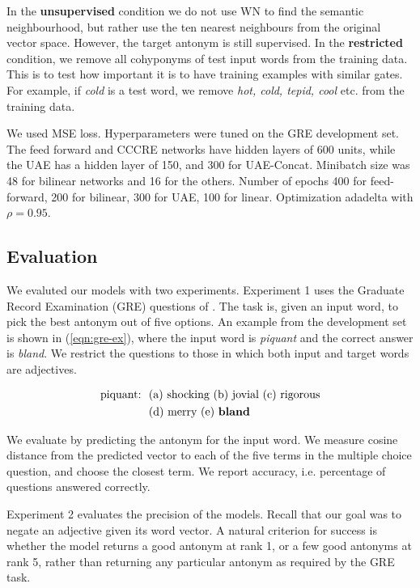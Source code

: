 \documentclass[11pt]{article}
\begin{document}
In the {\bf unsupervised} condition we do not use WN to find the semantic neighbourhood, but rather use the ten nearest neighbours from the original vector space. However, the target antonym is still supervised. In the {\bf restricted} condition, we remove all cohyponyms of test input words from the training data. This is to test how important it is to have training examples with similar gates. For example, if {\it cold} is a test word, we remove {\it hot, cold, tepid, cool} etc. from the training data.

We used MSE loss. Hyperparameters were tuned on the GRE development set. The feed forward and CCCRE networks have hidden layers of 600 units, while the UAE has a hidden layer of 150, and 300 for UAE-Concat. Minibatch size was 48 for bilinear networks and 16 for the others. Number of epochs 400 for feed-forward, 200 for bilinear, 300 for UAE, 100 for linear. Optimization adadelta with $\rho = 0.95$.


\subsection{Evaluation}

We evaluted our models with two experiments. Experiment 1 uses the Graduate Record Examination (GRE) questions of \citet{mohammad:13}. The task is, given an input word, to pick the best antonym out of five options. An example from the development set is shown in (\ref{eqn:gre-ex}), where the input word is {\it piquant} and the correct answer is {\it bland}. We restrict the questions to those in which both input and target words are adjectives.

\vspace{-6mm}
\begin{equation}
\begin{split}
\textrm{piquant:\ \ } & \textrm{(a) shocking (b) jovial (c) rigorous} \\
& \textrm{(d) merry (e) {\bf bland}}
\label{eqn:gre-ex}
\end{split}
\end{equation}
\vspace{-4mm}

We evaluate by predicting the antonym for the input word. We measure cosine distance from the predicted vector to each of the five terms in the multiple choice question, and choose the closest term. We report accuracy, i.e. percentage of questions answered correctly.

Experiment 2 evaluates the precision of the models. Recall that our goal was to negate an adjective given its word vector. A natural criterion for success is whether the model returns a good antonym at rank 1, or a few good antonyms at rank 5, rather than returning any particular antonym as required by the GRE task.
\end{document}
